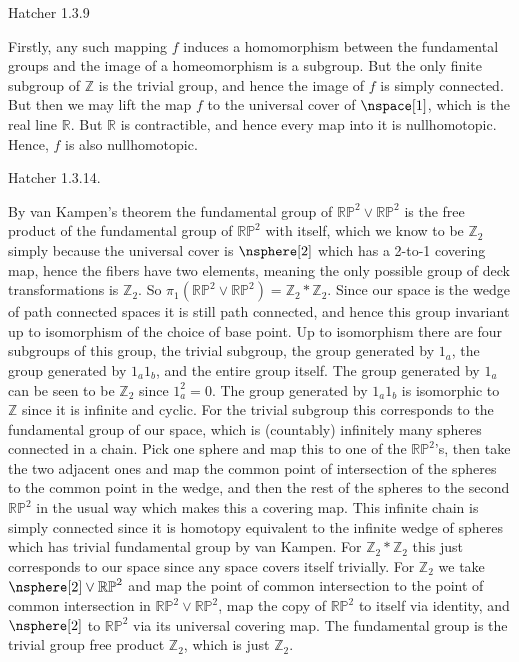 \documentclass{book}                                                           %
\begin{document}
\begin{problem}
    Hatcher 1.3.9
\end{problem}
\begin{solution}
    Firstly, any such mapping $f$ induces a homomorphism between the
    fundamental groups and the image of a homeomorphism is a subgroup. But
    the only finite subgroup of $\mathbb{Z}$ is the trivial group, and hence
    the image of $f$ is simply connected. But then we may lift the map $f$
    to the universal cover of $\nspace[1]$, which is the real line
    $\mathbb{R}$. But $\mathbb{R}$ is contractible, and hence every map into
    it is nullhomotopic. Hence, $f$ is also nullhomotopic.
\end{solution}
\begin{problem}
    Hatcher 1.3.14.
\end{problem}
\begin{solution}
    By van Kampen's theorem the fundamental group of
    $\mathbb{RP}^{2}\lor\mathbb{RP}^{2}$ is the free product of the
    fundamental group of $\mathbb{RP}^{2}$ with itself, which we know to be
    $\mathbb{Z}_{2}$ simply because the universal cover is $\nsphere[2]$
    which has a 2-to-1 covering map, hence the fibers have two elements,
    meaning the only possible group of deck transformations is
    $\mathbb{Z}_{2}$. So
    $\pi_{1}(\mathbb{RP}^{2}\lor\mathbb{RP}^{2})=\mathbb{Z}_{2}*\mathbb{Z}_{2}$.
    Since our space is the wedge of path connected spaces it is still path
    connected, and hence this group invariant up to isomorphism of the
    choice of base point. Up to isomorphism there are four subgroups of this
    group, the trivial subgroup, the group generated by $1_{a}$, the group
    generated by $1_{a}1_{b}$, and the entire group itself. The group
    generated by $1_{a}$ can be seen to be $\mathbb{Z}_{2}$ since
    $1_{a}^{2}=0$. The group generated by $1_{a}1_{b}$ is isomorphic to
    $\mathbb{Z}$ since it is infinite and cyclic. For the trivial subgroup
    this corresponds to the fundamental group of our space, which is
    (countably) infinitely many spheres connected in a chain. Pick one
    sphere and map this to one of the $\mathbb{RP}^{2}$'s, then take the two
    adjacent ones and map the common point of intersection of the spheres to
    the common point in the wedge, and then the rest of the spheres to the
    second $\mathbb{RP}^{2}$ in the usual way which makes this a covering
    map. This infinite chain is simply connected since it is homotopy
    equivalent to the infinite wedge of spheres which has trivial fundamental
    group by van Kampen. For $\mathbb{Z}_{2}*\mathbb{Z}_{2}$ this just
    corresponds to our space since any space covers itself trivially. For
    $\mathbb{Z}_{2}$ we take $\nsphere[2]\lor\mathbb{RP}^{2}$ and map the
    point of common intersection to the point of common intersection in
    $\mathbb{RP}^{2}\lor\mathbb{RP}^{2}$, map the copy of $\mathbb{RP}^{2}$
    to itself via identity, and $\nsphere[2]$ to $\mathbb{RP}^{2}$ via its
    universal covering map. The fundamental group is the trivial group
    free product $\mathbb{Z}_{2}$, which is just $\mathbb{Z}_{2}$.
\end{solution}
\end{document}
